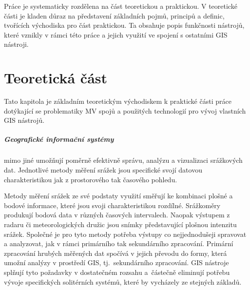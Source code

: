 \documentclass[a4paper,12pt,oneside]{report}
\begin{document}
Práce je systematicky rozdělena na část teoretickou a praktickou. V
teoretické části je kladen důraz na představení základních pojmů,
principů a definic, tvořících východiska pro část praktickou. Ta
obsahuje popis funkčnosti nástrojů, které vznikly v rámci této práce a
 jejich využití ve spojení s ostatními GIS nástroji.

 



\newpage
\chapter*{Teoretická
  část}

Tato kapitola je základním teoretickým východiskem k praktické části
práce dotýkající se problematiky MV spojů a použitých technologií pro
vývoj vlastních GIS nástrojů.

\paragraph*{Geografické informační systémy} mimo jiné umožňují poměrně
efektivně  správu, analýzu a vizualizaci sráž\-kových dat. 
Jednotlivé metody měření srážek jsou specifické svojí
datovou charakteristikou jak z prostorového tak časového pohledu.

Metody měření srážek ze své podstaty využití směřují ke kombinaci
plošné a bodové informace, které jsou svoji charakteristikou
rozdílné. Srážkoměry produkují bodová data v různých časových
intervalech. Naopak výstupem z radaru či meteorologických družic jsou
snímky představující plošnou
intenzitu srážek. 
Společné je pro tyto metody potřeba výstupy co nejjednodušeji
spravovat a analyzovat, jak v rámci primárního tak sekundá\-rního
zpracování. Primární zpracování hrubých měřených dat spočívá v jejich převodu
do formy, která umožní analýzy v prostředí GIS, tj.~sekundárního
zpracování.
GIS nástroje splňují tyto
požadavky v dostatečném rozsahu a~částečně eliminují potřebu vývoje
specifických solitérních systémů, které by vychá\-zely ze stejných
základů.
\end{document}
